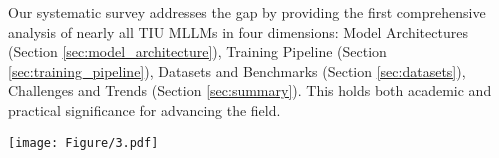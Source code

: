 Our systematic survey addresses the gap by providing the first comprehensive analysis of nearly all TIU MLLMs in four dimensions: Model Architectures (Section \ref{sec:model_architecture}), Training Pipeline  (Section \ref{sec:training_pipeline}), Datasets and Benchmarks (Section \ref{sec:datasets}), Challenges and Trends (Section \ref{sec:summary}). This holds both academic and practical significance for advancing the field.





\begin{figure*}
    \centering
    \texttt{[image: Figure/3.pdf]}
    \vspace{-1em}
    \label{fig:2}
    \vspace{-1em}
\end{figure*}